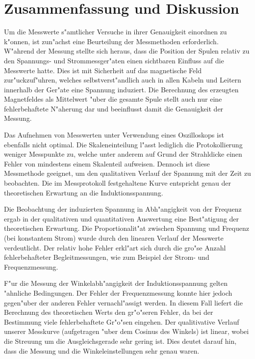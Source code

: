 \documentclass[a4paper,10pt]{article}
\begin{document}
\section{Zusammenfassung und Diskussion}
Um die Messwerte s"amtlicher Versuche in ihrer Genauigkeit einordnen zu k"onnen, ist zun"achst eine Beurteilung der Messmethoden erforderlich. W"ahrend der Messung stellte sich heraus, dass die Position der Spulen relativ zu den Spannungs- und Strommessger"aten einen sichtbaren Einfluss auf die Messwerte hatte. Dies ist mit Sicherheit auf das magnetische Feld zur"uckzuf"uhren, welches selbstverst"andlich auch in allen Kabeln und Leitern innerhalb der Ger"ate eine Spannung induziert. Die Berechnung des erzeugten Magnetfeldes als Mittelwert "uber die gesamte Spule stellt auch nur eine fehlerbehaftete N"aherung dar und beeinflusst damit die Genauigkeit der Messung.

Das Aufnehmen von Messwerten unter Verwendung eines Oszilloskops ist ebenfalls nicht optimal. Die Skaleneinteilung l"asst lediglich die Protokollierung weniger Messpunkte zu, welche unter anderem auf Grund der Strahldicke einen Fehler von mindestens einem Skalenteil aufweisen. Dennoch ist diese Messmethode geeignet, um den qualitativen Verlauf der Spannung mit der Zeit zu beobachten. Die im Messprotokoll festgehaltene Kurve entspricht genau der theoretischen Erwartung an die Induktionsspannung.

Die Beobachtung der induzierten Spannung in Abh"angigkeit von der Frequenz ergab in der qualitativen und quantitativen Auswertung eine Best"atigung der theoretischen Erwartung. Die Proportionalit"at zwischen Spannung und Frequenz (bei konstantem Strom) wurde durch den linearen Verlauf der Messwerte verdeutlicht. Der relativ hohe Fehler erkl"art sich durch die gro"se Anzahl fehlerbehafteter Begleitmessungen, wie zum Beispiel der Strom- und Frequenzmessung.

F"ur die Messung der Winkelabh"angigkeit der Induktionsspannung gelten "ahnliche Bedingungen. Der Fehler der Frequenzmessung konnte hier jedoch gegen"uber der anderen Fehler vernachl"assigt werden. In diesem Fall liefert die Berechnung des theoretischen Werts den gr"o"seren Fehler, da bei der Bestimmung viele fehlerbehaftete Gr"o"sen eingehen. Der qualitivative Verlauf unserer Messkurve (aufgetragen "uber dem Cosinus des Winkels) ist linear, wobei die Streuung um die Ausgleichsgerade sehr gering ist. Dies deutet darauf hin, dass die Messung und die Winkeleinstellungen sehr genau waren.
\end{document}

